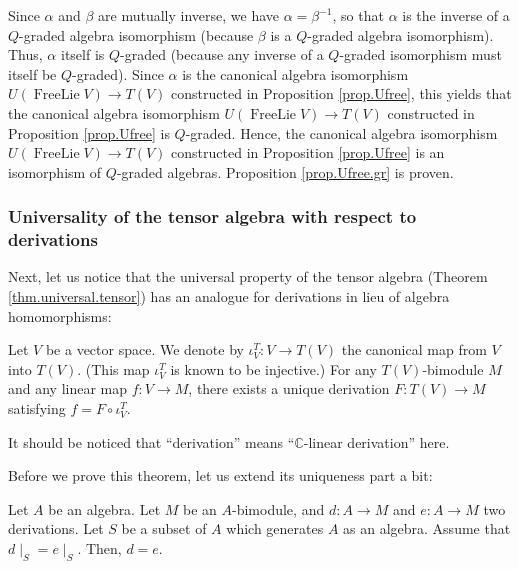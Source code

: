 \documentclass[etingof-lie.tex]{subfiles}
\begin{document}
\begin{verlong}
Since $\alpha$ and $\beta$ are mutually inverse, we have $\alpha=\beta^{-1}$,
so that $\alpha$ is the inverse of a $Q$-graded algebra isomorphism (because
$\beta$ is a $Q$-graded algebra isomorphism). Thus, $\alpha$ itself is
$Q$-graded (because any inverse of a $Q$-graded isomorphism must itself be
$Q$-graded). Since $\alpha$ is the canonical algebra isomorphism $U\left(
\operatorname*{FreeLie}V\right)  \rightarrow T\left(  V\right)  $ constructed
in Proposition \ref{prop.Ufree}, this yields that the canonical algebra
isomorphism $U\left(  \operatorname*{FreeLie}V\right)  \rightarrow T\left(
V\right)  $ constructed in Proposition \ref{prop.Ufree} is $Q$-graded. Hence,
the canonical algebra isomorphism $U\left(  \operatorname*{FreeLie}V\right)
\rightarrow T\left(  V\right)  $ constructed in Proposition \ref{prop.Ufree}
is an isomorphism of $Q$-graded algebras. Proposition \ref{prop.Ufree.gr} is proven.
\end{verlong}

\subsubsection{Universality of the tensor algebra with respect to derivations}

Next, let us notice that the universal property of the tensor algebra (Theorem
\ref{thm.universal.tensor}) has an analogue for derivations in lieu of algebra homomorphisms:

\begin{theorem}
\label{thm.universal.tensor.der}Let $V$ be a vector space. We denote by
$\iota_{V}^{T}:V\rightarrow T\left(  V\right)  $ the canonical map from $V$
into $T\left(  V\right)  $. (This map $\iota_{V}^{T}$ is known to be
injective.) For any $T\left(  V\right)  $-bimodule $M$ and any linear map
$f:V\rightarrow M$, there exists a unique derivation $F:T\left(  V\right)
\rightarrow M$ satisfying $f=F\circ\iota_{V}^{T}$.
\end{theorem}

It should be noticed that ``derivation'' means ``$\mathbb{C}$-linear
derivation'' here.

Before we prove this theorem, let us extend its uniqueness part a bit:

\begin{proposition}
\label{prop.derivation.unique}Let $A$ be an algebra. Let $M$ be an
$A$-bimodule, and $d:A\rightarrow M$ and $e:A\rightarrow M$ two derivations.
Let $S$ be a subset of $A$ which generates $A$ as an algebra. Assume that
$d\mid_{S}=e\mid_{S}$. Then, $d=e$.
\end{proposition}
\end{document}
